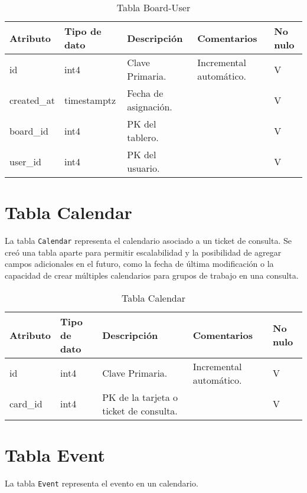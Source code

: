 \begin{table}[htbp]
\centering
\label{tab:board-user}

\begin{tabular}{|p{3cm}|p{2.5cm}|p{4.5cm}|p{4cm}|p{1cm}|}
\hline
\textbf{Atributo} & \textbf{Tipo de dato}  & \textbf{Descripción} & \textbf{Comentarios} & \textbf{No nulo} \\ \hline
id & int4 & Clave Primaria. & Incremental automático. & V \\ \hline
created\_at & timestamptz & Fecha de asignación. &  & V \\ \hline
board\_id & int4 & PK del tablero. &  & V \\ \hline
user\_id & int4 & PK del usuario. &  & V \\ \hline
\end{tabular}
\caption{Tabla Board-User}
\end{table}



\section{Tabla Calendar}\label{sec:table-calendar}
La tabla \texttt{Calendar} representa el calendario asociado a un ticket de consulta. Se creó una tabla aparte para permitir escalabilidad y la posibilidad de agregar campos adicionales en el futuro, como la fecha de última modificación o la capacidad de crear múltiples calendarios para grupos de trabajo en una consulta.

\begin{table}[htbp]
\centering
\label{tab:calendar}

\begin{tabular}{|p{3cm}|p{2.5cm}|p{4.5cm}|p{4cm}|p{1cm}|}
\hline
\textbf{Atributo} & \textbf{Tipo de dato}  & \textbf{Descripción} & \textbf{Comentarios} & \textbf{No nulo} \\ \hline
id & int4 & Clave Primaria. & Incremental automático. & V \\ \hline
card\_id & int4 & PK de la tarjeta o ticket de consulta. &  & V \\ \hline
\end{tabular}
\caption{Tabla Calendar}
\end{table}



\section{Tabla Event}\label{sec:table-calendar}
La tabla \texttt{Event} representa el evento en un calendario.

